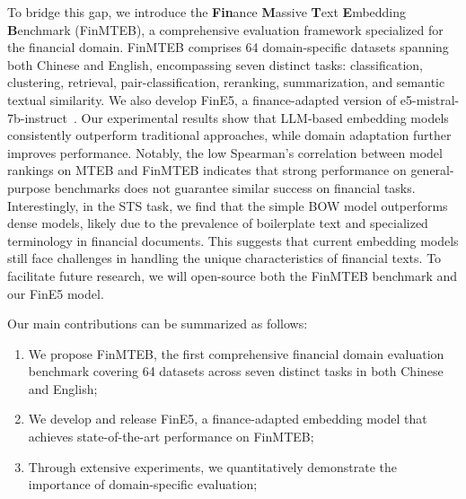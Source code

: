 To bridge this gap, we introduce the \textbf{Fin}ance \textbf{M}assive \textbf{T}ext \textbf{E}mbedding \textbf{B}enchmark (FinMTEB), a comprehensive evaluation framework specialized for the financial domain. FinMTEB comprises 64 domain-specific datasets spanning both Chinese and English, encompassing seven distinct tasks: classification, clustering, retrieval, pair-classification, reranking, summarization, and semantic textual similarity. We also develop FinE5, a finance-adapted version of e5-mistral-7b-instruct~\citep{e5}. Our experimental results show that LLM-based embedding models consistently outperform traditional approaches, while domain adaptation further improves performance. Notably, the low Spearman's correlation between model rankings on MTEB and FinMTEB indicates that strong performance on general-purpose benchmarks does not guarantee similar success on financial tasks. Interestingly, in the STS task, we find that the simple BOW model outperforms dense models, likely due to the prevalence of boilerplate text and specialized terminology in financial documents. This suggests that current embedding models still face challenges in handling the unique characteristics of financial texts. To facilitate future research, we will open-source both the FinMTEB benchmark and our FinE5 model.


Our main contributions can be summarized as follows:

\begin{enumerate}

\item We propose FinMTEB, the first comprehensive financial domain evaluation benchmark covering 64 datasets across seven distinct tasks in both Chinese and English;

\item We develop and release FinE5, a finance-adapted embedding model that achieves state-of-the-art performance on FinMTEB;

\item Through extensive experiments, we quantitatively demonstrate the importance of domain-specific evaluation;

\end{enumerate}
